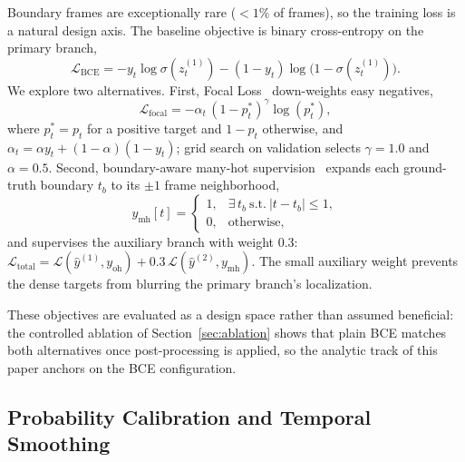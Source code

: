 Boundary frames are exceptionally rare ($<1\%$ of frames), so the training
loss is a natural design axis. The baseline objective is binary
cross-entropy on the primary branch,
\begin{equation}
    \mathcal{L}_{\mathrm{BCE}}
    = -y_t\log\sigma(z^{(1)}_t)-(1-y_t)\log\bigl(1-\sigma(z^{(1)}_t)\bigr).
    \label{eq:bce}
\end{equation}
We explore two alternatives. First, Focal Loss~\cite{lin2017focal}
down-weights easy negatives,
\begin{equation}
    \mathcal{L}_{\mathrm{focal}} = -\alpha_t\,(1-p^{*}_t)^{\gamma}\log(p^{*}_t),
    \label{eq:focal}
\end{equation}
where $p^{*}_t=p_t$ for a positive target and $1-p_t$ otherwise, and
$\alpha_t=\alpha y_t+(1-\alpha)(1-y_t)$; grid search on validation selects
$\gamma=1.0$ and $\alpha=0.5$. Second, boundary-aware many-hot
supervision~\cite{muller2019label} expands each ground-truth boundary $t_b$
to its $\pm1$ frame neighborhood,
\begin{equation}
    y_{\mathrm{mh}}[t]=\begin{cases}1, & \exists\, t_b\ \text{s.t.}\ |t-t_b|\le 1,\\ 0, & \text{otherwise},\end{cases}
    \label{eq:manyhot}
\end{equation}
and supervises the auxiliary branch with weight 0.3:
$\mathcal{L}_{\mathrm{total}}=\mathcal{L}(\hat y^{(1)}, y_{\mathrm{oh}})
+0.3\,\mathcal{L}(\hat y^{(2)}, y_{\mathrm{mh}})$. The small auxiliary
weight prevents the dense targets from blurring the primary branch's
localization.

These objectives are evaluated as a design space rather than assumed
beneficial: the controlled ablation of Section~\ref{sec:ablation} shows that
plain BCE matches both alternatives once post-processing is applied, so the
analytic track of this paper anchors on the BCE configuration.

\subsection{Probability Calibration and Temporal Smoothing}
\label{sec:postprocess}

